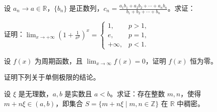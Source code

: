 \noindent\begin{minipage}{\textwidth}
设 $a_n\to a\in\mathbb R$，$\{b_n\}$ 是正数列，$\displaystyle c_n=\frac{a_1b_1+a_2b_2+\cdots+a_nb_n}{b_1+b_2+\cdots+b_n}$。求证：
\end{minipage}\par\vfill
\noindent\begin{minipage}{\textwidth}
证明：$\displaystyle\lim_{x\to+\infty}\left(1+\frac1{x^p}\right)^x=\begin{cases}1,&p>1,\\e,&p=1,\\+\infty,&p<1.\end{cases}$
\end{minipage}\par\vfill
\noindent\begin{minipage}{\textwidth}
设 $f(x)$ 为周期函数，且 $\lim_{x\to\infty}f(x)=0$，证明 $f(x)$ 恒为零。
\end{minipage}\par\vfill
\newpage
\noindent\begin{minipage}{\textwidth}
证明下列关于单侧极限的结论。
\end{minipage}\par\vfill
\noindent\begin{minipage}{\textwidth}
设 $\xi$ 是无理数，$a,b$ 是实数且 $a<b$。求证：存在整数 $m,n$，使得 $m+n\xi\in(a,b)$，即集合 $S=\{m+n\xi\mid m,n\in\mathbb Z\}$ 在 $\mathbb R$ 中稠密。
\end{minipage}\par\vfill
